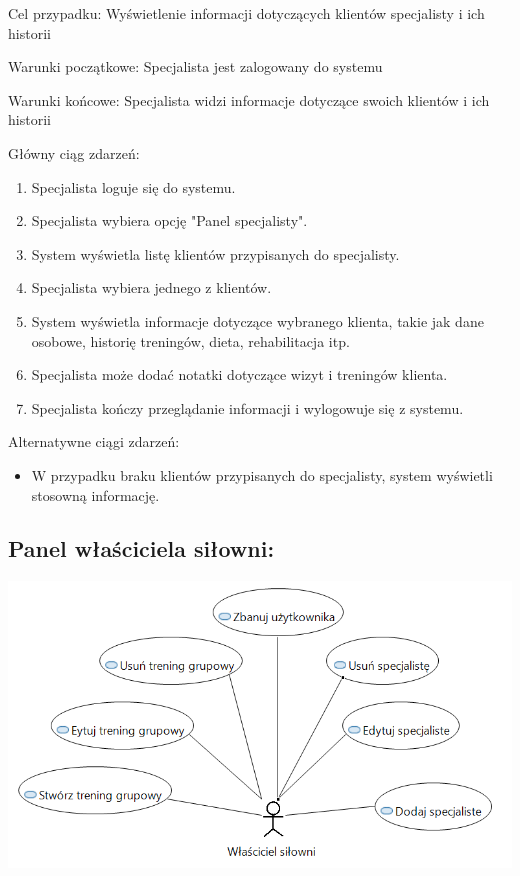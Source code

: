 \documentclass[
]{article}
\providecommand{\tightlist}{%
  \setlength{\itemsep}{0pt}\setlength{\parskip}{0pt}}
\begin{document}
{Cel przypadku: Wyświetlenie informacji dotyczących klientów specjalisty
i ich historii}

{Warunki początkowe: Specjalista jest zalogowany do systemu}

{Warunki końcowe: Specjalista widzi informacje dotyczące swoich klientów
i ich historii}

{Główny ciąg zdarzeń:}

\begin{enumerate}
\tightlist
\item
  {Specjalista loguje się do systemu.}
\item
  {Specjalista wybiera opcję "Panel specjalisty".}
\item
  {System wyświetla listę klientów przypisanych do specjalisty.}
\item
  {Specjalista wybiera jednego z klientów.}
\item
  {System wyświetla informacje dotyczące wybranego klienta, takie jak
  dane osobowe, historię treningów, dieta, rehabilitacja itp.}
\item
  {Specjalista może dodać notatki dotyczące wizyt i treningów klienta.}
\item
  {Specjalista kończy przeglądanie informacji i wylogowuje się z
  systemu.}
\end{enumerate}

{Alternatywne ciągi zdarzeń:}

\begin{itemize}
\tightlist
\item
  {W przypadku braku klientów przypisanych do specjalisty, system
  wyświetli stosowną informację.}
\end{itemize}

{}

\hypertarget{h.2ol8m2kl4itm}{%
\subsection{\texorpdfstring{{Panel właściciela
siłowni:}}{Panel właściciela siłowni:}}\label{h.2ol8m2kl4itm}}

{\includegraphics{diagrams/use_cases/wlasciciel_silowni.png}}
\end{document}
